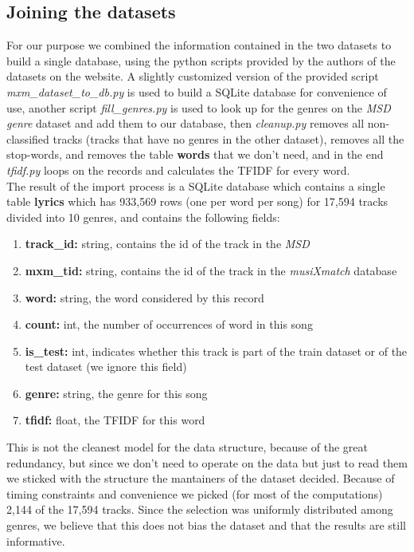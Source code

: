 \documentclass[a4paper, 11pt]{article} %
\begin{document}
\subsection*{Joining the datasets}
For our purpose we combined the information contained in the two datasets to build a single database, using the python scripts provided by the authors of the datasets on the website. A slightly customized version of the provided script \textit{mxm\_dataset\_to\_db.py} is used to build a SQLite database for convenience of use, another script \textit{fill\_genres.py} is used to look up for the genres on the \textit{MSD genre} dataset and add them to our database, then \textit{cleanup.py} removes all non-classified tracks (tracks that have no genres in the other dataset), removes all the stop-words, and removes the table \textbf{words} that we don't need, and in the end \textit{tfidf.py} loops on the records and calculates the TFIDF for every word. \\
The result of the import process is a SQLite database which contains a single table \textbf{lyrics} which has 933,569 rows (one per word per song) for 17,594 tracks divided into 10 genres, and contains the following fields:
\begin{enumerate}
\item \textbf{track\_id:} string, contains the id of the track in the \textit{MSD} 
\item \textbf{mxm\_tid:} string, contains the id of the track in the \textit{musiXmatch} database
\item \textbf{word:} string, the word considered by this record
\item \textbf{count:} int, the number of occurrences of word in this song
\item \textbf{is\_test:} int, indicates whether this track is part of the train dataset or of the test dataset (we ignore this field)
\item \textbf{genre:} string, the genre for this song
\item \textbf{tfidf:} float, the TFIDF for this word
\end{enumerate}
This is not the cleanest model for the data structure, because of the great redundancy, but since we don't need to operate on the data but just to read them we sticked with the structure the mantainers of the dataset decided.
Because of timing constraints and convenience we picked (for most of the computations) 2,144 of the 17,594 tracks. Since the selection was uniformly distributed among genres, we believe that this does not bias the dataset and that the results are still informative.
\end{document}
